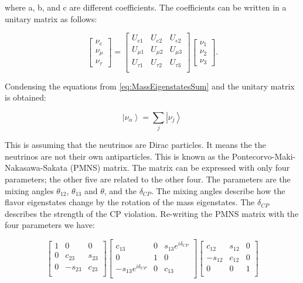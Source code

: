 where a, b, and c are different coefficients. The coefficients can be written in a unitary matrix as follows:

\begin{equation}
    \begin{bmatrix}
        \nu_e \\ \nu_\mu \\ \nu_\tau
    \end{bmatrix}
    = 
    \begin{bmatrix}
        U_{e1} & U_{e2} & U_{e2}\\
        U_{\mu1} & U_{\mu2} & U_{\mu3}\\
        U_{\tau1} & U_{\tau2} & U_{\tau3}\\
    \end{bmatrix}
    \begin{bmatrix}
        \nu_1 \\ \nu_2 \\ \nu_3
    \end{bmatrix}.
\end{equation}

Condensing the equations from \ref{eq:MassEigenstatesSum} and the unitary matrix is obtained:

\begin{equation}
    \left|\nu_\alpha\right> = \sum_j\left|\nu_j \right>
    \label{eq:CondensedPMNS}
\end{equation}

This is assuming that the neutrinos are Dirac particles. It means the the neutrinos are not their own antiparticles. This is known as the Pontecorvo-Maki-Nakasawa-Sakata (PMNS) matrix. The matrix can be expressed with only four parameters; the other five are related to the other four. The parameters are the mixing angles $\theta_{12}$, $\theta_{13}$ and $\theta$, and the $\delta_{CP}$. The mixing angles describe how the flavor eigenstates change by the rotation of the mass eigenstates. The $\delta_{CP}$ describes the strength of the CP violation. Re-writing the PMNS matrix with the four parameters we have:

\begin{equation}
    \begin{bmatrix}
        1 & 0 & 0\\
        0 & c_{23} & s_{23}\\
        0 & -s_{23} & c_{23}\\
    \end{bmatrix}
    \begin{bmatrix}
        c_{13} & 0 & s_{13}e^{i\delta_{CP}}\\
        0 & 1 & 0\\
        -s_{13}e^{i\delta_{CP}} & 0 & c_{13}\\
    \end{bmatrix}
    \begin{bmatrix}
        c_{12} & s_{12} & 0\\
        -s_{12} & c_{12} & 0\\
        0 & 0 & 1\\
    \end{bmatrix}
\end{equation}



